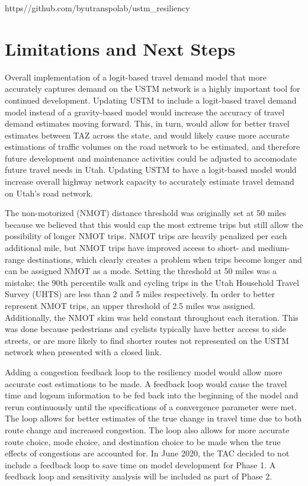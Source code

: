 https\://github.com/byu\-transpolab/ustm\_resiliency

\section{Limitations and Next Steps}

Overall implementation of a logit-based travel demand model that more
accurately captures demand on the USTM network is a highly important tool
for continued development. Updating USTM to include a logit-based travel
demand model instead of a gravity-based model would increase the accuracy
of travel demand estimates moving forward. This, in turn, would allow for
better travel estimates between TAZ across the state, and would likely
cause more accurate estimations of traffic volumes on the road network to
be estimated, and therefore future development and maintenance activities
could be adjusted to accomodate future travel needs in Utah.  Updating USTM
to have a logit-based model would increase overall highway network capacity
to accurately estimate travel demand on Utah’s road network.

The non-motorized (NMOT) distance threshold was originally set at 50 miles
because we believed that this would cap the most extreme trips but still
allow the possibility of longer NMOT trips. NMOT trips are heavily
penalized per each additional mile, but NMOT trips have improved access to
short- and medium-range destinations, which clearly creates a problem when
trips become longer and can be assigned NMOT as a mode. Setting the
threshold at 50 miles was a mistake; the 90th percentile walk and cycling
trips in the Utah Household Travel Survey (UHTS) are less than 2 and 5
miles respectively. In order to better represent NMOT trips, an upper
threshold of 2.5 miles was assigned. Additionally, the NMOT skim was held
constant throughout each iteration. This was done because pedestrians and
cyclists typically have better access to side streets, or are more likely
to find shorter routes not represented on the USTM network when presented
with a closed link.

Adding a congestion feedback loop to the resiliency model would allow more
accurate cost estimations to be made. A feedback loop would cause the
travel time and logsum information to be fed back into the beginning of the
model and rerun continuously until the specifications of a convergence
parameter were met. The loop allows for better estimates of the true change
in travel time due to both route change and increased congestion. The loop
also allows for more accurate route choice, mode choice, and destination
choice to be made when the true effects of congestions are accounted for.
In June 2020, the TAC decided to not include a feedback loop to save time
on model development for Phase 1. A feedback loop and sensitivity analysis
will be included as part of Phase 2.

